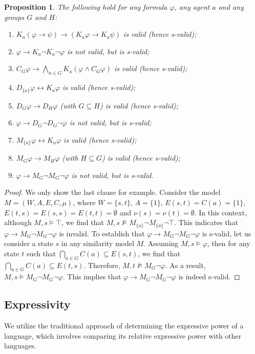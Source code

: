 \documentclass{article}
\newtheorem{proposition}[theorem]{Proposition}%
\newcommand{\ab}{\ensuremath{A}\xspace}
\newcommand{\lra}{\leftrightarrow}
\renewcommand{\phi}{\varphi}
\newcommand{\ra}{\rightarrow}
\begin{document}
\begin{proposition}
The following hold for any formula $\phi$, any agent $a$ and any groups $G$ and $H$:
\begin{enumerate}
\item $K_a(\phi \ra \psi) \ra (K_a\phi \ra K_a\psi)$ is valid (hence s-valid);
\item $\phi \ra K_a \neg K_a \neg \phi$ is not valid, but is s-valid;
\item $C_{G}\phi \ra \bigwedge_{a\in G} K_a(\phi \wedge C_G \phi)$ is valid (hence s-valid);
\item $D_{\{a\}}\phi \lra K_a\phi$ is valid (hence s-valid);
\item $D_G \phi \ra D_H \phi$ (with $G \subseteq H$) is valid (hence s-valid);
\item $\phi \ra D_G \neg D_G \neg \phi$ is not valid, but is s-valid;
\item $M_{\{a\}}\phi \lra K_a\phi$ is valid (hence s-valid);
\item $M_G \phi \ra M_H \phi$ (with $H \subseteq G$) is valid (hence s-valid);
\item $\phi \ra M_G \neg M_G \neg \phi$ is not valid, but is s-valid.
\end{enumerate}
\end{proposition}
\begin{proof}
We only show the last clause for example. Consider the model $M=(W,\ab,E,C,\mu)$, where $W=\{s,t\}$, $\ab=\{1\}$, $E(s,t)=C(a)=\{1\}$, $E(t,s)=E(s,s)=E(t,t)=\emptyset$ and $\nu(s)=\nu(t)=\emptyset$. In this context, although $M,s \models \top$, we find that $M,s \not \models M_{\{a\}} \neg M_{\{a\}}\neg \top$. This indicates that $\phi \ra M_G \neg M_G \neg \phi$ is invalid. To establish that $\phi \ra M_G \neg M_G \neg \phi$ is s-valid, let us consider a state $s$ in any similarity model $M$. Assuming $M,s \models \phi$, then for any state $t$ such that $\bigcap_{a\in G}C(a)\subseteq E(s,t)$, we find that $\bigcap_{a \in G} C(a) \subseteq E(t,s)$. Therefore, $M,t \not \models M_G\neg\phi$. As a result, $M,s \models M_G \neg M_G \neg \phi$. This implies that $\phi \ra M_G \neg M_G \neg \phi$ is indeed s-valid.
\end{proof}

\subsection{Expressivity}
\label{sec:expressivity}

We utilize the traditional approach of determining the expressive power of a language, which involves comparing its relative expressive power with other languages.
\end{document}
